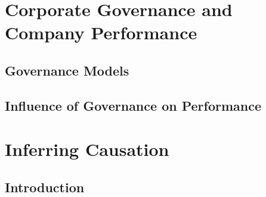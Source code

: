\section{Corporate Governance and Company Performance}
\subsection{Governance Models}
\subsection{Influence of Governance on Performance}
\section{Inferring Causation}
\subsection{Introduction}
